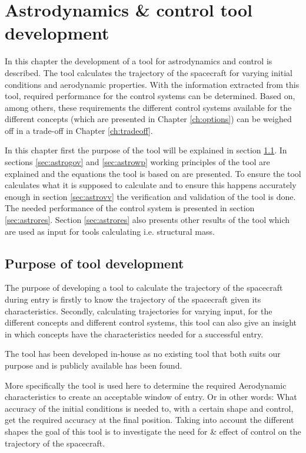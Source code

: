 \section{Astrodynamics \& control tool development}
\label{ch:astrocontrol}
In this chapter the development of a tool for astrodynamics and control is described. The tool calculates the trajectory of the spacecraft for varying initial conditions and aerodynamic properties. With the information extracted from this tool, required performance for the control systems can be determined. Based on, among others, these requirements the different control systems available for the different concepts (which are presented in Chapter \ref{ch:options}) can be weighed off in a trade-off in Chapter \ref{ch:tradeoff}.

In this chapter first the purpose of the tool will be explained in section \ref{sec:astropurpose}. In sections \ref{sec:astrogov} and \ref{sec:astrowp} working principles of the tool are explained and the equations the tool is based on are presented. To ensure the tool calculates what it is supposed to calculate and to ensure this happens accurately enough in section \ref{sec:astrovv} the verification and validation of the tool is done. The needed performance of the control system is presented in section \ref{sec:astrores}. Section \ref{sec:astrores} also presents other results of the tool which are used as input for tools calculating i.e. structural mass.

\subsection{Purpose of tool development}
\label{sec:astropurpose}
The purpose of developing a tool to calculate the trajectory of the spacecraft during entry is firstly to know the trajectory of the spacecraft given its characteristics. Secondly, calculating trajectories for varying input, for the different concepts and different control systems, this tool can also give an insight in which concepts have the characteristics needed for a successful entry.

The tool has been developed in-house as no existing tool that both suits our purpose and is publicly available has been found.

More specifically the tool is used here to determine the required Aerodynamic characteristics to create an acceptable window of entry. Or in other words: What accuracy of the initial conditions is needed to, with a certain shape and control, get the required accuracy at the final position. Taking into account the different shapes the goal of this tool is to investigate the need for \& effect of control on the trajectory of the spacecraft.

